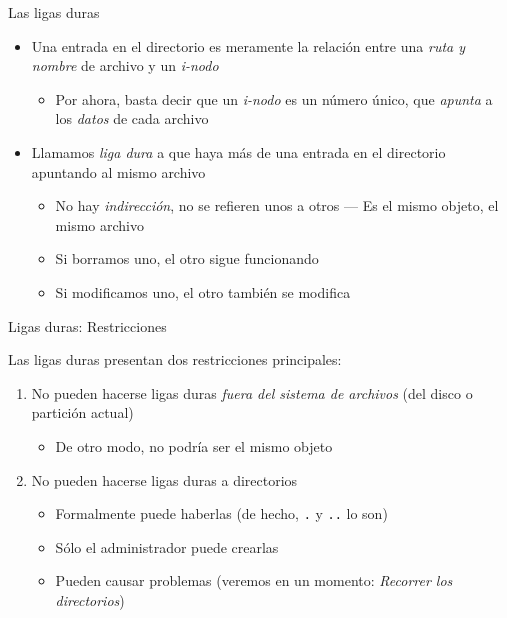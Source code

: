 \documentclass[presentation]{beamer}
\begin{document}
\begin{frame}[label={sec:orgab87def}]{Las ligas duras}
\begin{itemize}
\item Una entrada en el directorio es meramente la relación entre una
\emph{ruta y nombre} de archivo y un \emph{i-nodo}
\begin{itemize}
\item Por ahora, basta decir que un \emph{i-nodo} es un número único, que
\emph{apunta} a los \emph{datos} de cada archivo
\end{itemize}
\item Llamamos \emph{liga dura} a que haya más de una entrada en el directorio
apuntando al mismo archivo
\begin{itemize}
\item No hay \emph{indirección}, no se refieren unos a otros — Es el mismo
objeto, el mismo archivo
\item Si borramos uno, el otro sigue funcionando
\item Si modificamos uno, el otro también se modifica
\end{itemize}
\end{itemize}
\end{frame}

\begin{frame}[label={sec:orga58f511},fragile]{Ligas duras: Restricciones}
 \begin{center}
Las ligas duras presentan dos restricciones principales:
\end{center}
\begin{enumerate}
\item No pueden hacerse ligas duras \emph{fuera del sistema de archivos} (del
disco o partición actual)
\begin{itemize}
\item De otro modo, no podría ser el mismo objeto
\end{itemize}
\item No pueden hacerse ligas duras a directorios
\begin{itemize}
\item Formalmente puede haberlas (de hecho, \texttt{.} y \texttt{..} lo son)
\item Sólo el administrador puede crearlas
\item Pueden causar problemas (veremos en un momento: \emph{Recorrer los
directorios})
\end{itemize}
\end{enumerate}
\end{frame}
\end{document}
